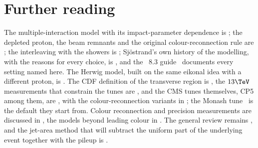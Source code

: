 \section{Further reading}
\label{sec:uninvited_cousins:further_reading}
The multiple-interaction model with its impact-parameter dependence is
\cite{Sjostrand:1987su}; the depleted proton, the beam remnants and the
original colour-reconnection rule are \cite{Sjostrand:2004pf}; the
interleaving with the showers is \cite{Sjostrand:2004ef}; Sj\"ostrand's own
history of the modelling, with the reasons for every choice, is
\cite{Sjostrand:2017cdm}, and the \PYTHIA~8.3 guide~\cite{Bierlich:2022pfr}
documents every setting named here. The Herwig model, built on the same
eikonal idea with a different proton, is \cite{Bahr:2008dy}. The CDF
definition of the transverse region is \cite{CDF:2001onq,Field:2002vt}, the
$13\TeV$ measurements that constrain the tunes are
\cite{ATLAS:2017blj,CMS:2017ngy}, and the CMS tunes themselves, CP5 among
them, are \cite{CMS:2019csb}, with the colour-reconnection variants in
\cite{CMS:2022awf}; the Monash tune~\cite{Skands:2014pea} is the \PYTHIA
default they start from. Colour reconnection and precision measurements
are discussed in \cite{Sjostrand:2013cya,Argyropoulos:2014zoa}, the models
beyond leading colour in \cite{Christiansen:2015yqa,Gieseke:2012ft}. The
general review remains \cite{Buckley:2011ms}, and the jet-area method that
will subtract the uniform part of the underlying event together with the
pileup is \cite{Cacciari:2008gn}.

